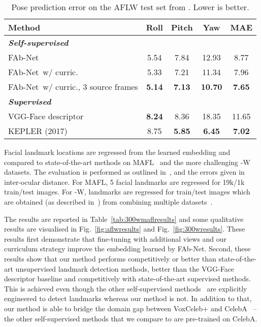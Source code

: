 \documentclass{bmvc2k}
\newcommand{\figref}[1]{Fig.~\ref{#1}}
\def\networkname{FAb-Net}
\begin{document}
\begin{table}
\begin{minipage}{0.43\linewidth}
\begin{tabular}{ | p{1.6cm} | c | c | c| c|}
{\bf Method} &  {\bf Roll}&  {\bf Pitch} & {\bf Yaw} & {\bf MAE}\\ \hline 
{\textit{\textbf{Self-supervised}}} & & & & \\
\networkname~ & {{5.54}} & {7.84} & {12.93} & {8.77}\\ 
\networkname~w/ curric. & {{5.33}} & {7.21} & {11.34} & {7.96}\\ 
\networkname~w/ curric., 3 source frames & {\bf{5.14}} & {\bf 7.13} & {\bf 10.70} & {\bf 7.65}\\ \hline \hline
{\textit{\textbf{Supervised}}} & & & & \\
VGG-Face descriptor~\cite{Parkhi15} & {\bf 8.24}  & {8.36} & {18.35} & {11.65} \\
KEPLER \cite{Kumar17} (2017) & {8.75}  & {\bf 5.85} & {\bf 6.45} & {\bf{7.02}} \\ \hline
\end{tabular}
\caption{Pose prediction error on the AFLW test set from \cite{Kumar17}. Lower is better.}	
\label{tab:poseresults}
\end{minipage}

\end{table}
Facial landmark locations are regressed from the learned embedding and compared to state-of-the-art methods on MAFL~\cite{Zhang16} and the more challenging -W~\cite{sagonas2016300} datasets.
The evaluation is performed as outlined in~\cite{Zhang16,Thewlis17a}, and the errors given in inter-ocular distance. 
For MAFL, 5 facial landmarks are regressed for 19k/1k train/test images. 
For -W,  landmarks are regressed for  train/test images which are obtained (as described in~\cite{Thewlis17a}) from combining multiple datasets~\cite{zhu12facewild,Belhumeur13,Zhou13workshops}.

The results are reported in Table~\ref{tab:300wmaflresults} and some qualitative results are visualised in \figref{fig:aflwresults} and \figref{fig:300wresults}. 
These results first demonstrate that fine-tuning with additional views and our curriculum strategy improve the embedding learned by \networkname.
Second, these results show that our method performs competitively or better than state-of-the-art unsupervised landmark detection methods, better than the VGG-Face descriptor baseline and competitively with state-of-the-art supervised methods.
This is achieved even though the other self-supervised methods~\cite{zhang2018unsupervised,Thewlis17a,Thewlis17b,jakab2018conditional} are explicitly engineered to detect landmarks whereas our method is not. In addition to that, our method is able to bridge the domain gap between VoxCeleb+ and CelebA~\cite{liu2015faceattributes} -- the other self-supervised methods that we compare to are pre-trained on CelebA.
\end{document}
